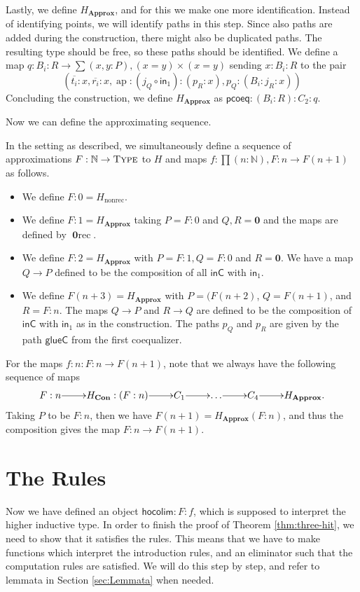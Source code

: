 \documentclass[a4paper,UKenglish]{lipics-v2016}
\newcommand{\Boperator}[1]{\mathsf{#1}}
\newcommand{\inn}{\Boperator{in}}
\newcommand{\zero}[0]{\textbf{0}}
\newcommand{\frec}[0]{\!\operatorname{rec}}
\newcommand{\nonrec}[0]{\operatorname{nonrec}}
\newcommand{\ap}[0]{\operatorname{ap}}
\newcommand{\Con}[0]{\textbf{Con}}
\newcommand{\Approx}[0]{\textbf{Approx}}
\newcommand{\inC}[0]{\Boperator{inC}}
\newcommand{\glueC}[0]{\Boperator{glueC}}
\newcommand{\pcoeq}[0]{\Boperator{pcoeq}}
\newcommand{\hocolim}[0]{\Boperator{hocolim}}
\newcommand{\Type}[0]{\operatorname{\textsc{Type}}}
\begin{document}
Lastly, we define $H_\Approx$, and for this we make one more identification.
Instead of identifying points, we will identify paths in this step.
Since also paths are added during the construction, there might also be duplicated paths.
The resulting type should be free, so these paths should be identified.
We define a map $q : B_i : R \rightarrow \sum (x, y : P), (x = y) \times (x = y)$ sending $x : B_i : R$ to the pair
\[
(\overline{t_i} : x, \overline{r_i} : x, \ap : (j_Q \circ \inn_1) : (p_R : x), p_Q : (B_i : j_R : x))
\]
Concluding the construction, we define $H_{\Approx}$ as $\pcoeq : (B_i : R) : C_2 : q$.

Now we can define the approximating sequence.

\begin{definition}
In the setting as described, we simultaneously define a sequence of approximations $F : \mathbb{N} \rightarrow \Type$ to $H$ and maps $f : \prod(n : \mathbb{N}), F : n \rightarrow F(n+1)$ as follows.
\begin{itemize}
        \item We define $F : 0 = H_{\nonrec}$.
        \item We define $F : 1 = H_{\Approx}$ taking $P = F : 0$ and $Q, R = \zero$ and the maps are defined by $\zero\frec$.
        \item We define $F : 2 = H_{\Approx}$ with $P= F : 1, Q = F : 0$ and $R =\zero$. We have a map $Q \rightarrow P$ defined to be the composition of all $\inC$ with $\inn_1$.
        \item We define $F(n+3) = H_{\Approx}$ with $P = (F(n+2)$, $Q = F(n+1)$, and $R = F : n$. The maps $Q \rightarrow P$ and $R \rightarrow Q$ are defined to be the composition of $\inC$ with $\inn_1$ as in the construction. The paths $p_Q$ and $p_R$ are given by the path $\glueC$ from the first coequalizer.
\end{itemize}
For the maps $f : n : F : n \rightarrow F(n + 1)$, note that we always have the following sequence of maps
\[
\xymatrix@1
{
        F : n \ar[r] & H_{\Con} : (F : n) \ar[r] & C_1 \ar[r] & \ldots \ar[r] & C_4 \ar[r] & H_{\Approx}.
}
\]
Taking $P$ to be $F : n$, then we have $F (n+1) = H_{\Approx} (F : n)$, and thus the composition gives the map $F : n \rightarrow F(n + 1)$.
\end{definition}

\section{The Rules}
\label{sec:rules}
Now we have defined an object $\hocolim : F : f$, which is supposed to interpret the higher inductive type.
In order to finish the proof of Theorem \ref{thm:three-hit}, we need to show that it satisfies the rules.
This means that we have to make functions which interpret the introduction rules, and an eliminator such that the computation rules are satisfied.
We will do this step by step, and refer to lemmata in Section \ref{sec:Lemmata} when needed.
\end{document}

